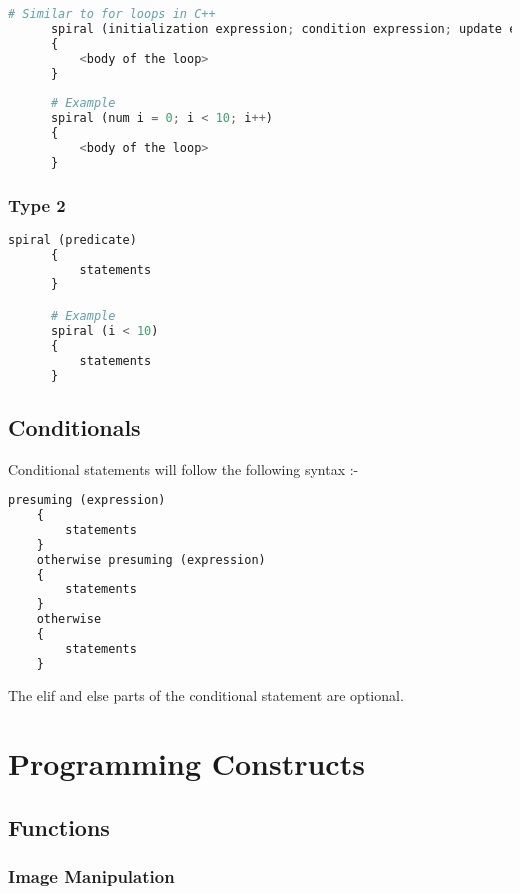 \documentclass[a4paper, 11pt]{article}
\begin{document}
    
      \begin{lstlisting}[language=Python]
      # Similar to for loops in C++
      spiral (initialization expression; condition expression; update expression)
      {
          <body of the loop>
      }
      
      # Example
      spiral (num i = 0; i < 10; i++)
      {
          <body of the loop>
      }\end{lstlisting}

      \subsubsection*{Type 2}

      
      \begin{lstlisting}[language=Python]
      spiral (predicate) 
      {
          statements
      }

      # Example
      spiral (i < 10)
      {
          statements
      }\end{lstlisting}  

    \subsection{Conditionals}

    Conditional statements will follow the following syntax :-
    \begin{lstlisting}[language=Python]
    presuming (expression)
    {
        statements
    }
    otherwise presuming (expression)
    {
        statements
    }
    otherwise
    {
        statements
    }\end{lstlisting}

    The elif and else parts of the conditional statement are optional.

\section{Programming Constructs}
    \subsection{Functions}
          \subsubsection{Image Manipulation}
          
\end{document}

